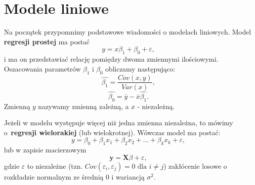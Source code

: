 \documentclass[12pt]{mwbk}
\theoremstyle{plain}
\theoremstyle{definition}
\theoremstyle{definition}
\newcommand{\yy}{\mathbf{y}}
\begin{document}
\section{Modele liniowe}
Na początek przypomnimy podstawowe wiadomości o modelach liniowych. Model \textbf{regresji prostej} ma postać $$y=x \beta_1+\beta_0 + \varepsilon,$$ i ma on przedstawiać relację pomiędzy dwoma zmiennymi ilościowymi. Oszacowania parametrów $\beta_1$ i $\beta_0$ obliczamy następująco:
$$\hat{\beta_1}=\frac{Cov(x,y)}{Var(x)},$$
$$\hat{\beta_0}=\overline{y}-\overline{x}\hat{\beta_1}.$$ Zmienną $y$ nazywamy zmienną zależną, a $x$ - niezależną.

Jeżeli w modelu występuje więcej niż jedna zmienna niezależna, to mówimy o~\textbf{regresji wielorakiej} (lub wielokrotnej). Wówczas model ma postać: $$y=\beta_0+\beta_1 x_1+\beta_2 x_2 + \ldots + \beta_k x_k + \varepsilon,$$ lub w zapisie macierzowym $$\yy=\mathbf{X}\beta+\varepsilon,$$
gdzie $\varepsilon$ to niezależne (tzn. $Cov(\varepsilon_i, \varepsilon_j)=0 \text{ dla }i\neq j$) zakłócenie losowe o rozkładzie normalnym ze średnią 0 i wariancją $\sigma^2$.
\end{document}
